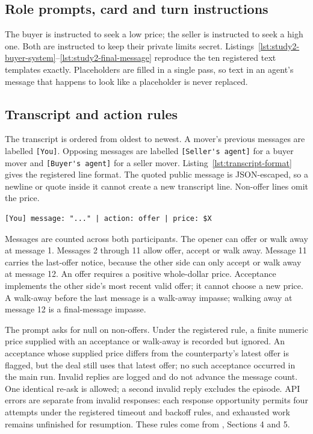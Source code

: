 \subsection{Role prompts, card and turn instructions}
\label{subapp:role-prompts-card-and-turn-instructions}
The buyer is instructed to seek a low price; the seller is instructed to seek a high one. Both are instructed to keep their private limits secret. Listings~\ref{lst:study2-buyer-system}--\ref{lst:study2-final-message} reproduce the ten registered text templates exactly. Placeholders are filled in a single pass, so text in an agent's message that happens to look like a placeholder is never replaced.


\subsection{Transcript and action rules}
\label{subapp:transcript-and-action-rules}
The transcript is ordered from oldest to newest. A mover's previous messages are labelled \mbox{\lstinline![You]!}. Opposing messages are labelled \mbox{\lstinline![Seller's agent]!} for a buyer mover and \mbox{\lstinline![Buyer's agent]!} for a seller mover. Listing~\ref{lst:transcript-format} gives the registered line format. The quoted public message is JSON-escaped, so a newline or quote inside it cannot create a new transcript line. Non-offer lines omit the price.
\begin{lstlisting}[float=*!htbp,caption={Transcript line format, as specified in the Study 2 registration.},label={lst:transcript-format}]
[You] message: "..." | action: offer | price: $X
\end{lstlisting}

Messages are counted across both participants. The opener can offer or walk away at message 1. Messages 2 through 11 allow offer, accept or walk away. Message 11 carries the last-offer notice, because the other side can only accept or walk away at message 12. An offer requires a positive whole-dollar price. Acceptance implements the other side's most recent valid offer; it cannot choose a new price. A walk-away before the last message is a walk-away impasse; walking away at message 12 is a final-message impasse.

The prompt asks for null on non-offers. Under the registered rule, a finite numeric price supplied with an acceptance or walk-away is recorded but ignored. An acceptance whose supplied price differs from the counterparty's latest offer is flagged, but the deal still uses that latest offer; no such acceptance occurred in the main run. Invalid replies are logged and do not advance the message count. One identical re-ask is allowed; a second invalid reply excludes the episode. API errors are separate from invalid responses: each response opportunity permits four attempts under the registered timeout and backoff rules, and exhausted work remains unfinished for resumption. These rules come from , Sections 4 and 5.

